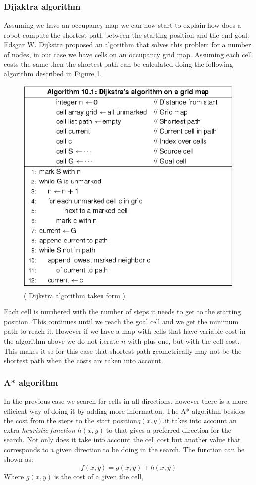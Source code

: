 \subsubsection{Dijaktra algorithm}\label{djk}
Assuming we have an occupancy map we can now start to explain how does a robot compute the shortest path between the starting position and the end goal. Edsgar W. Dijkstra proposed an algorithm that solves this problem for a number of nodes, in our case we have cells on an occupancy grid map. Assuming each cell costs the same then the shortest path can be calculated doing the following algorithm described in Figure \ref{fig:dalg}. 
\begin{figure}[h] 
\centerline{\includegraphics [width=0.7 \textwidth]{imgs/chapter5/Dalg.png}}
\caption{( Dijkstra algorithm taken form \cite{Ben-Ari2018})}
\label{fig:dalg}
\end{figure}
Each cell is numbered with the number of steps it needs to get to the starting position. This continues until we reach the goal cell and we get the minimum path to reach it. However if we have a map with cells that have variable cost in the algorithm above we do not iterate $n$ with plus one, but with the cell cost. This makes it so for this case that  shortest path geometrically may not be the shortest path when the costs are taken into account.

\subsubsection{A* algorithm}\label{A*}
In the previous case we search for cells in all directions, however there is a more efficient way of doing it by adding more information. The A* algorithm besides the cost from the steps to the start position$g(x,y)$,it takes into account an extra \textit{heuristic function} $h(x, y)$ to that gives a preferred direction for the search. Not only does it take into account the cell cost but another value that corresponds to a given direction to be doing in  the search. The function can be shown as:
\begin{equation}
    f(x,y)=g(x,y) + h(x,y)
\end{equation}
Where $g(x,y)$ is the cost of a given the cell, 
